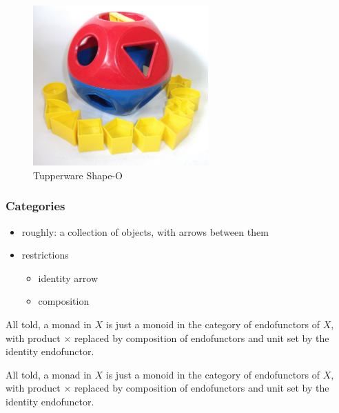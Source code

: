 \documentclass[include/preamble.tex]{subfiles}
\begin{document}
\begin{frame}
  \begin{figure}
    \begin{center}
      \includegraphics[width=0.6\textwidth]{images/tupperware-shape-o.jpg}
    \end{center}
    \caption{Tupperware Shape-O}
  \end{figure}
\end{frame}

\begin{frame}
  \frametitle{Categories}
  \begin{itemize}
  \item roughly: a collection of objects, with arrows between them
  \item restrictions
    \begin{itemize}
    \item identity arrow
    \item composition
    \end{itemize}
  \end{itemize}
\end{frame}



\begin{frame}
  \begin{displayquote}
    All told, a monad in \(X\) is just a monoid in the category of
    endofunctors of \(X\), with product \(\times\) replaced by composition of
    endofunctors and unit set by the identity endofunctor.
  \end{displayquote}
\end{frame}

\begin{frame}
  \begin{displayquote}
    All told, a monad in \(X\) is just a monoid in the category of
    endofunctors of \(X\), with product \(\times\) replaced by composition of
    endofunctors and unit set by the identity endofunctor.
  \end{displayquote}
\end{frame}
\end{document}
